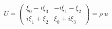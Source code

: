 \begin{equation}
U= \left(
\begin{array}{cc}
\xi_{0}-i\xi_{3}  & -i\xi_{1}-\xi_{2}  \\
i\xi_{1}+\xi_{2}  &  \xi_{0}+i\xi_{3}
\end{array}
\right) = \rho~u
\end{equation}

